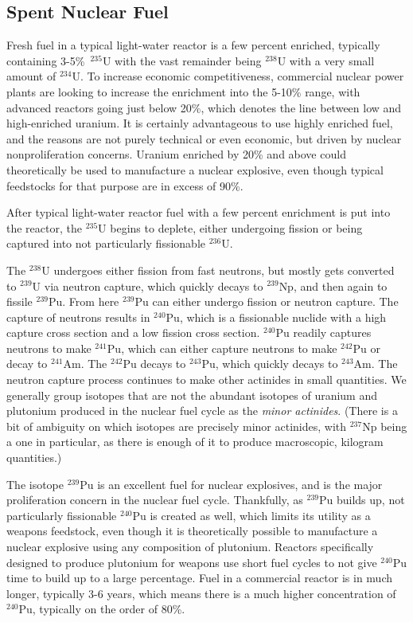 \subsection{Spent Nuclear Fuel}

Fresh fuel in a typical light-water reactor is a few percent enriched, typically containing 3-5\%~$^{235}$U with the vast remainder being $^{238}$U with a very small amount of $^{234}$U. To increase economic competitiveness, commercial nuclear power plants are looking to increase the enrichment into the 5-10\% range, with advanced reactors going just below 20\%, which denotes the line between low and high-enriched uranium. It is certainly advantageous to use highly enriched fuel, and the reasons are not purely technical or even economic, but driven by nuclear nonproliferation concerns. Uranium enriched by 20\% and above could theoretically be used to manufacture a nuclear explosive, even though typical feedstocks for that purpose are in excess of 90\%.

After typical light-water reactor fuel with a few percent enrichment is put into the reactor, the $^{235}$U begins to deplete, either undergoing fission or being captured into not particularly fissionable $^{236}$U. 

The $^{238}$U undergoes either fission from fast neutrons, but mostly gets converted to $^{239}$U via neutron capture, which quickly decays to $^{239}$Np, and then again to fissile $^{239}$Pu. From here $^{239}$Pu can either undergo fission or neutron capture. The capture of neutrons results in $^{240}$Pu, which is a fissionable nuclide with a high capture cross section and a low fission cross section. $^{240}$Pu readily captures neutrons to make $^{241}$Pu, which can either capture neutrons to make $^{242}$Pu or decay to $^{241}$Am. The $^{242}$Pu decays to $^{243}$Pu, which quickly decays to $^{243}$Am. The neutron capture process continues to make other actinides in small quantities. We generally group isotopes that are not the abundant isotopes of uranium and plutonium produced in the nuclear fuel cycle as the \emph{minor actinides}. (There is a bit of ambiguity on which isotopes are precisely minor actinides, with $^{237}$Np being a one in particular, as there is enough of it to produce macroscopic, kilogram quantities.)

The isotope $^{239}$Pu is an excellent fuel for nuclear explosives, and is the major proliferation concern in the nuclear fuel cycle. Thankfully, as $^{239}$Pu builds up, not particularly fissionable $^{240}$Pu is created as well, which limits its utility as a weapons feedstock, even though it is theoretically possible to manufacture a nuclear explosive using any composition of plutonium. Reactors specifically designed to produce plutonium for weapons use short fuel cycles to not give $^{240}$Pu time to build up to a large percentage. Fuel in a commercial reactor is in much longer, typically 3-6 years, which means there is a much higher concentration of $^{240}$Pu, typically on the order of 80\%.


